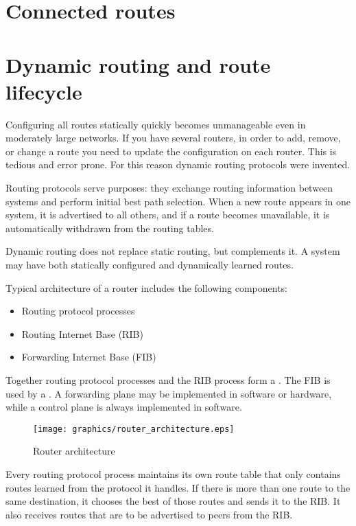 \section{Connected routes}


\section{Dynamic routing and route lifecycle}

Configuring all routes statically quickly becomes unmanageable even in moderately large networks.
If you have several routers, in order to add, remove, or change a route you need to update the 
configuration on each router. This is tedious and error prone. For this reason dynamic routing
protocols were invented.

Routing protocols serve purposes: they exchange routing information between systems and
perform initial best path selection. When a new route appears in one system, it is advertised
to all others, and if a route becomes unavailable, it is automatically withdrawn from the routing tables.

Dynamic routing does not replace static routing, but complements it. A system may have both
statically configured and dynamically learned routes.

Typical architecture of a router includes the following components:

\begin{itemize}
\item Routing protocol processes
\item Routing Internet Base (RIB)
\item Forwarding Internet Base (FIB)
\end{itemize}

Together routing protocol processes and the RIB process form a .
The FIB is used by a . A forwarding plane may be implemented in software
or hardware, while a control plane is always implemented in software.

\begin{figure}[h]
    \centering
    \texttt{[image: graphics/router\_architecture.eps]}
    \caption{Router architecture}
    \label{fig:router_architecture}
\end{figure}

Every routing protocol process maintains its own route table that only contains routes learned
from the protocol it handles. If there is more than one route to the same destination, it
chooses the best of those routes and sends it to the RIB. It also receives routes that
are to be advertised to peers from the RIB.

